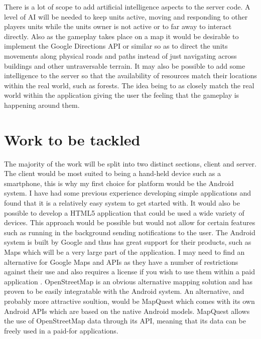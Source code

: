 \documentclass[11pt,fleqn,twoside]{article}
\begin{document}
There is a lot of scope to add artificial intelligence aspects to the server code. A level of AI will be needed to keep units active, moving and responding to other players units while the units owner is not active or to far away to interact directly. Also as the gameplay takes place on a map it would be desirable to implement the Google Directions API or similar so as to direct the units movements along physical roads and paths instead of just navigating across buildings and other untraversable terrain. It may also be possible to add some intelligence to the server so that the availability of resources match their locations within the real world, such as forests. The idea being to as closely match the real world within the application giving the user the feeling that the gameplay is happening around them.



\section{Work to be tackled}

The majority of the work will be split into two distinct sections, client and server. The client would be most suited to being a hand-held device such as a smartphone, this is why my first choice for platform would be the Android system. I have had some previous experience developing simple applications and found that it is a relatively easy system to get started with. It would also be possible to develop a HTML5 application that could be used a wide variety of devices. This approach would be possible but would not allow for certain features such as running in the background sending notifications to the user. The Android system is built by Google and thus has great support for their products, such as Maps which will be a very large part of the application. I may need to find an alternative for Google Maps and APIs as they have a number of restrictions against their use \cite{google_maps_license} and also requires a license if you wish to use them within a paid application \cite{google_maps_premier}. OpenStreetMap is an obvious alternative mapping solution and has proven to be easily integratable with the Android system. An alternative, and probably more attractive soultion, would be MapQuest \cite{MapQuest} which comes with its own Android APIs which are based on the native Android models. MapQuest allows the use of OpenStreetMap data through its API, meaning that its data can be freely used in a paid-for applications.
\end{document}
